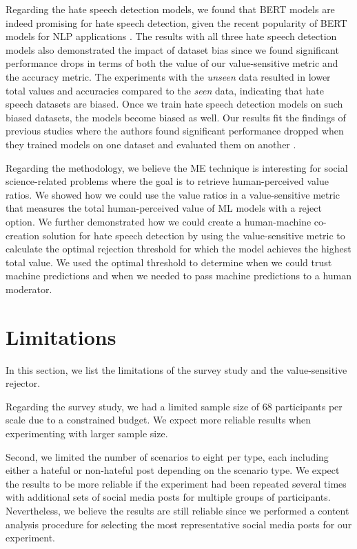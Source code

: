 %
Regarding the hate speech detection models, we found that BERT models are indeed promising for hate speech detection, given the recent popularity of BERT models for NLP applications \citep{edwards2021best,alatawi2021detecting}.
%
The results with all three hate speech detection models also demonstrated the impact of dataset bias since we found significant performance drops in terms of both the value of our value-sensitive metric and the accuracy metric.
%
The experiments with the \emph{unseen} data resulted in lower total values and accuracies compared to the \emph{seen} data, indicating that hate speech datasets are biased.
%
Once we train hate speech detection models on such biased datasets, the models become biased as well.
%
Our results fit the findings of previous studies where the authors found significant performance dropped when they trained models on one dataset and evaluated them on another \citep{grondahl2018all, arango2019hate}.
%

%
Regarding the methodology, we believe the ME technique is interesting for social science-related problems where the goal is to retrieve human-perceived value ratios.
%
We showed how we could use the value ratios in a value-sensitive metric that measures the total human-perceived value of ML models with a reject option.
%
We further demonstrated how we could create a human-machine co-creation solution for hate speech detection by using the value-sensitive metric to calculate the optimal rejection threshold for which the model achieves the highest total value.
%
We used the optimal threshold to determine when we could trust machine predictions and when we needed to pass machine predictions to a human moderator.

\section{Limitations}
\label{sec:discussion-limitations}
In this section, we list the limitations of the survey study and the value-sensitive rejector.
%

%
Regarding the survey study, we had a limited sample size of 68 participants per scale due to a constrained budget.
%
We expect more reliable results when experimenting with larger sample size.
%

%
Second, we limited the number of scenarios to eight per type, each including either a hateful or non-hateful post depending on the scenario type.
%
We expect the results to be more reliable if the experiment had been repeated several times with additional sets of social media posts for multiple groups of participants.
%
Nevertheless, we believe the results are still reliable since we performed a content analysis procedure for selecting the most representative social media posts for our experiment.
%

